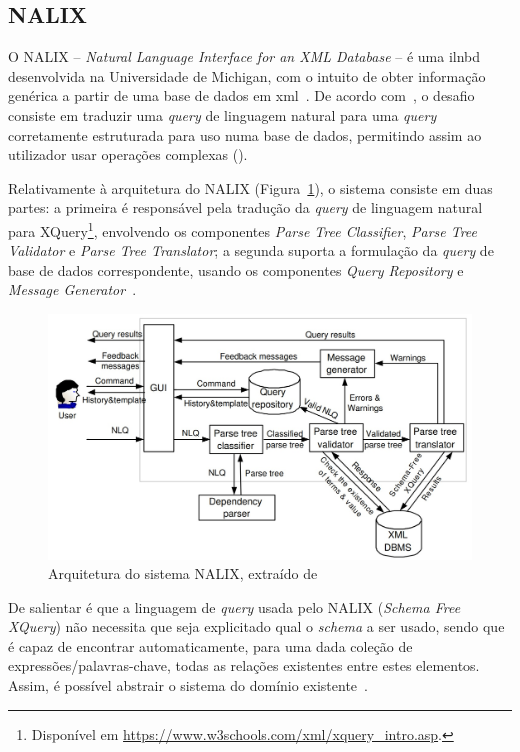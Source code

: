 \subsection{NALIX}
O NALIX -- \textit{Natural Language Interface for an XML Database} -- é uma \gls{ilnbd} desenvolvida na Universidade de Michigan, com o intuito de obter informação genérica a partir de uma base de dados em \gls{xml}~\parencite{nalix_interactive_nli_querying_xml}. De acordo com~\textcite{nalix_interactive_nli_querying_xml}, o desafio consiste em traduzir uma \textit{query} de linguagem natural para uma \textit{query} corretamente estruturada para uso numa base de dados, permitindo assim ao utilizador usar operações complexas ().

Relativamente à arquitetura do NALIX (Figura~\ref{fig:nalix_architecture}), o sistema consiste em duas partes: a primeira é responsável pela tradução da \textit{query} de linguagem natural para XQuery\footnote{Disponível em \url{https://www.w3schools.com/xml/xquery_intro.asp}.}, envolvendo os componentes \textit{Parse Tree Classifier}, \textit{Parse Tree Validator} e \textit{Parse Tree Translator}; a segunda suporta a formulação da \textit{query} de base de dados correspondente, usando os componentes \textit{Query Repository} e \textit{Message Generator}~\parencite{nalix_interactive_nli_querying_xml}.

\begin{figure}[!ht]
    \centering
    \includegraphics[width=.7\textwidth]{ch03/assets/nalix_architecture.jpg}
    \caption{Arquitetura do sistema NALIX, extraído de~\textcite{nalix_interactive_nli_querying_xml}}
    \label{fig:nalix_architecture}
\end{figure}

De salientar é que a linguagem de \textit{query} usada pelo NALIX (\textit{Schema Free XQuery}) não necessita que seja explicitado qual o \textit{schema} a ser usado, sendo que é capaz de encontrar automaticamente, para uma dada coleção de expressões/palavras-chave, todas as relações existentes entre estes elementos. Assim, é possível abstrair o sistema do domínio existente~\parencite{nalix_interactive_nli_querying_xml, survey_nlidb}.

